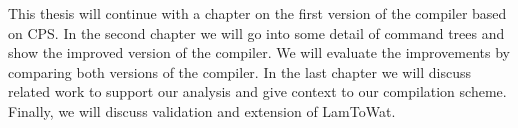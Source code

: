 This thesis will continue with a chapter on the first version of the compiler based on CPS. In the second chapter we will go into some detail of command trees and show the improved version of the compiler. We will evaluate the improvements by comparing both versions of the compiler. In the last chapter we will discuss related work to support our analysis and give context to our compilation scheme. Finally, we will discuss validation and extension of LamToWat.
